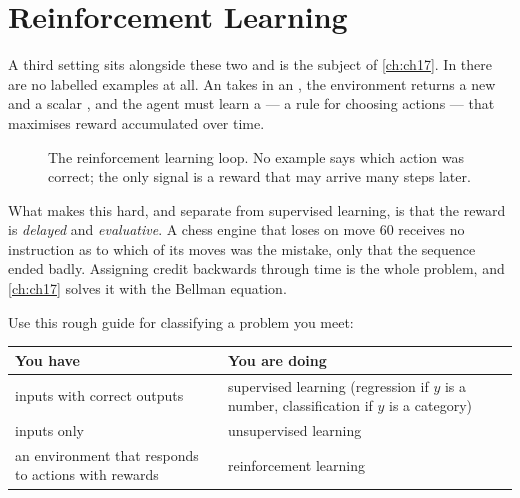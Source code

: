 \section{Reinforcement Learning}
\label{sec:rl-preview}

A third setting sits alongside these two and is the subject of \cref{ch:ch17}.
In  there are no labelled examples at all. An
 takes  in an , the environment
returns a new  and a scalar , and the agent must learn a
 --- a rule for choosing actions --- that maximises reward
accumulated over time.

\begin{figure}[htbp]
  \centering
  \caption{The reinforcement learning loop. No example says which action was
  correct; the only signal is a reward that may arrive many steps later.}
  \label{fig:rl}
\end{figure}

What makes this hard, and separate from supervised learning, is that the reward
is \emph{delayed} and \emph{evaluative}. A chess engine that loses on move 60
receives no instruction as to which of its moves was the mistake, only that the
sequence ended badly. Assigning credit backwards through time is the whole
problem, and \cref{ch:ch17} solves it with the Bellman equation.

Use this rough guide for classifying a problem you meet:

\begin{center}
\small
\renewcommand{\arraystretch}{1.25}
\begin{tabular}{@{}L{4.2cm}L{6.8cm}@{}}
\toprule
\textbf{You have} & \textbf{You are doing}\\
\midrule
inputs with correct outputs & supervised learning
  (regression if $y$ is a number, classification if $y$ is a category)\\
inputs only & unsupervised learning\\
an environment that responds to actions with rewards &
  reinforcement learning\\
\bottomrule
\end{tabular}
\end{center}

